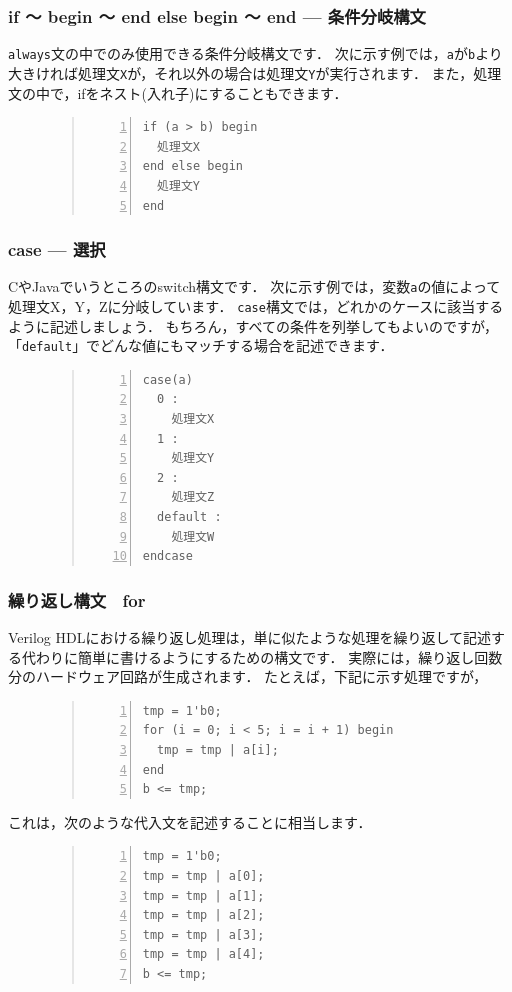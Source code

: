 \documentclass[a4paper,dvipdfmx]{jsarticle}
\begin{document}
\subsubsection{if 〜 begin 〜 end else begin 〜 end --- 条件分岐構文}
\verb|always|文の中でのみ使用できる条件分岐構文です．
次に示す例では，\verb|a|が\verb|b|より大きければ処理文\verb|X|が，それ以外の場合は処理文\verb|Y|が実行されます．
また，処理文の中で，ifをネスト(入れ子)にすることもできます．
\begin{figure}[H]
\begin{quote}
\begin{Verbatim}[frame=single, numbers=left, baselinestretch=0.8]
if (a > b) begin
  処理文X
end else begin
  処理文Y
end
\end{Verbatim}
\end{quote}
\end{figure}

\subsubsection{case --- 選択}
CやJavaでいうところのswitch構文です．
次に示す例では，変数\verb|a|の値によって処理文X，Y，Zに分岐しています．
\verb|case|構文では，どれかのケースに該当するように記述しましょう．
もちろん，すべての条件を列挙してもよいのですが，「\verb|default|」でどんな値にもマッチする場合を記述できます．
\begin{figure}[H]
\begin{quote}
\begin{Verbatim}[frame=single, numbers=left, baselinestretch=0.8]
case(a)
  0 :
    処理文X
  1 :
    処理文Y
  2 :
    処理文Z
  default :
    処理文W
endcase
\end{Verbatim}
\end{quote}
\end{figure}

\subsubsection{繰り返し構文　for}
Verilog HDLにおける繰り返し処理は，単に似たような処理を繰り返して記述する代わりに簡単に書けるようにするための構文です．
実際には，繰り返し回数分のハードウェア回路が生成されます．
たとえば，下記に示す処理ですが，
\begin{figure}[H]
\begin{quote}
\begin{Verbatim}[frame=single, numbers=left, baselinestretch=0.8]
tmp = 1'b0;
for (i = 0; i < 5; i = i + 1) begin
  tmp = tmp | a[i];
end
b <= tmp;
\end{Verbatim}
\end{quote}
\end{figure}
これは，次のような代入文を記述することに相当します．
\begin{figure}[H]
\begin{quote}
\begin{Verbatim}[frame=single, numbers=left, baselinestretch=0.8]
tmp = 1'b0;
tmp = tmp | a[0];
tmp = tmp | a[1];
tmp = tmp | a[2];
tmp = tmp | a[3];
tmp = tmp | a[4];
b <= tmp;
\end{Verbatim}
\end{quote}
\end{figure}
\end{document}

